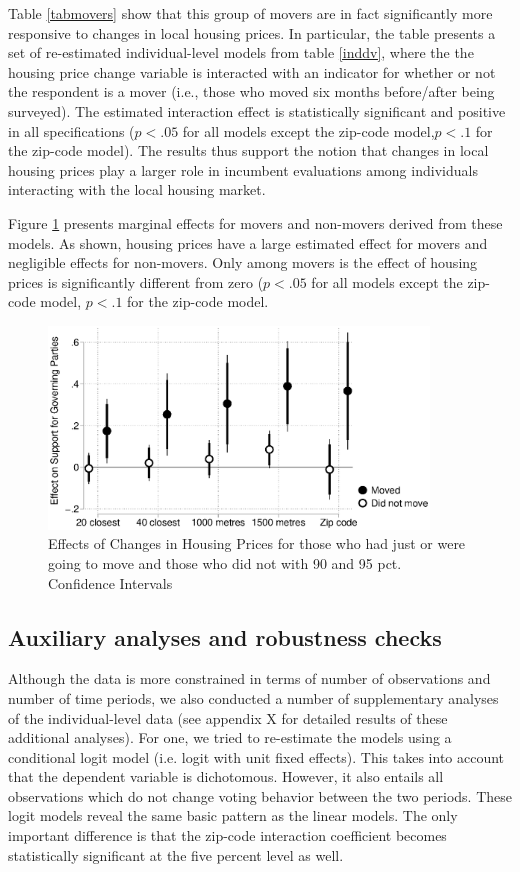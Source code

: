 \documentclass[12pt,a4paper]{article}
\begin{document}
	Table \ref{tabmovers} show that this group of movers are in fact significantly more responsive to changes in local housing prices. In particular, the table presents a set of re-estimated individual-level models from table \ref{inddv}, where the the housing price change variable is interacted with an indicator for whether or not the respondent is a mover (i.e., those who moved six months before/after being surveyed). The estimated interaction effect is statistically significant and positive in all specifications ($p<.05$ for all models except the zip-code model,$p<.1$ for the zip-code model). The results thus support the notion that  changes in local housing prices play a larger role in incumbent evaluations among individuals interacting with the local housing market.
	
	Figure \ref{move} presents marginal effects for movers and non-movers derived from these models. As shown, housing prices have a large estimated effect for movers and negligible effects for non-movers.  Only among movers is the effect of housing prices is significantly different from zero ($p<.05$ for all models except the zip-code model, $p<.1$ for the zip-code model.
	
	
	
	\begin{figure}[htbp!]
		\includegraphics[width=0.9\textwidth]{../figures/moving.eps}
		\centering
		\caption{Effects of Changes in Housing Prices for those who had just or were going to move and those who did not with 90 and 95 pct. Confidence Intervals}\label{move}
	\end{figure}
	
	
	\subsection{Auxiliary analyses and robustness checks}
	
	Although the data is more constrained in terms of number of observations and number of time periods, we also conducted a number of supplementary analyses of the individual-level data (see appendix X for detailed results of these additional analyses). For one, we tried to re-estimate the models using a conditional logit model (i.e. logit with unit fixed effects). This takes into account that the dependent variable is dichotomous. However, it also entails all observations which do not change voting behavior between the two periods. These logit models reveal the same basic pattern as the linear models. The only important difference is that the zip-code interaction coefficient becomes statistically significant at the five percent level as well. 
	
\end{document}
